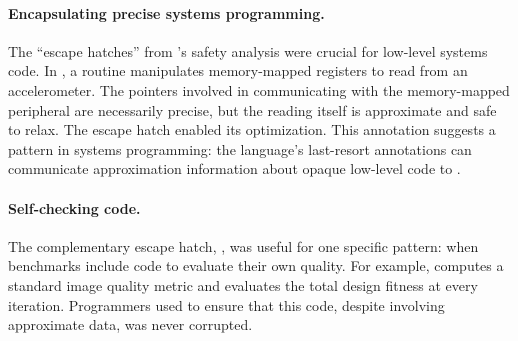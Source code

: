 \paragraph{Encapsulating precise systems programming.}
The ``escape hatches'' from \sysname's safety analysis were crucial for
low-level systems code.
In , a routine manipulates memory-mapped registers to read
from an accelerometer. The pointers involved in
communicating with the memory-mapped peripheral are necessarily precise, but
the reading itself is approximate and safe to relax.
The \annpermit escape hatch enabled its optimization.
This annotation suggests a pattern in systems programming: the language's
last-resort annotations can communicate approximation information about
opaque low-level code to \sysname.

\paragraph{Self-checking code.}
The complementary escape hatch, \annforbid, was useful for one specific
pattern: when benchmarks include code to evaluate their own quality. For
example,  computes a standard image quality metric and
 evaluates the total design fitness at every iteration.
Programmers used \annforbid to ensure that this code, despite involving
approximate data, was never corrupted.
